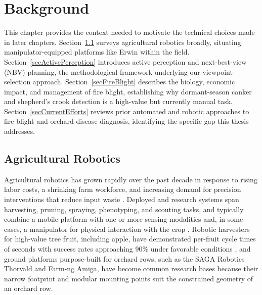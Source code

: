 
\chapter{Background} \label{chapBackground}

This chapter provides the context needed to motivate the technical choices
made in later chapters.
Section~\ref{secAgRobotics} surveys agricultural robotics broadly, situating
manipulator-equipped platforms like Erwin within the field.
Section~\ref{secActivePerception} introduces active perception and
next-best-view (NBV) planning, the methodological framework underlying our
viewpoint-selection approach.
Section~\ref{secFireBlight} describes the biology, economic impact, and
management of fire blight, establishing why dormant-season canker and
shepherd's crook detection is a high-value but currently manual task.
Section~\ref{secCurrentEfforts} reviews prior automated and robotic approaches
to fire blight and orchard disease diagnosis, identifying the specific gap
this thesis addresses.

\section{Agricultural Robotics} \label{secAgRobotics}

Agricultural robotics has grown rapidly over the past decade in response to
rising labor costs, a shrinking farm workforce, and increasing demand for
precision interventions that reduce input waste \cite{droukas2023survey}.
Deployed and research systems span harvesting, pruning, spraying, phenotyping,
and scouting tasks, and typically combine a mobile platform with one or more
sensing modalities and, in some cases, a manipulator for physical interaction
with the crop \cite{droukas2023survey}.
Robotic harvesters for high-value tree fruit, including apple, have
demonstrated per-fruit cycle times of seconds with success rates approaching
90\% under favorable conditions \cite{droukas2023survey}, and ground platforms
purpose-built for orchard rows, such as the SAGA Robotics Thorvald and Farm-ng
Amiga, have become common research bases because their narrow footprint and 
modular mounting points suit the constrained geometry of an orchard row.

